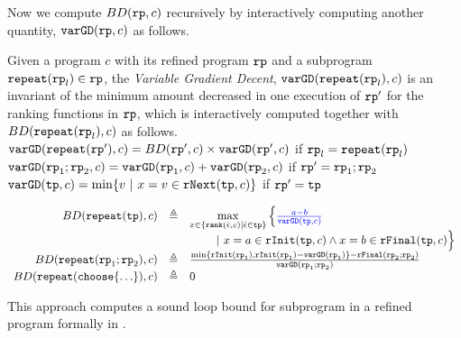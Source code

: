 Now we compute $BD(\mathtt{rp}, c)$ recursively by interactively computing another quantity, $\mathtt{varGD}(\mathtt{rp}, c)$ as follows.
\begin{defn}
\label{def:loopbound}
Given a program $c$ with its refined program $\mathtt{rp}$ and a subprogram $\mathtt{repeat}(\mathtt{rp}_l) \in \mathtt{rp}$,
the \emph{Variable Gradient Decent}, 
 $\mathtt{varGD}(\mathtt{repeat}(\mathtt{rp}_l), c)$ is an invariant of the minimum amount decreased in one execution of $\mathtt{rp}'$ for the ranking functions in $\mathtt{rp}$, which is interactively computed together with $BD(\mathtt{repeat}(\mathtt{rp}_l), c)$ as follows.
 \\
 {$\mathtt{varGD}(\mathtt{repeat}(\mathtt{rp}'), c) =  BD(\mathtt{rp}', c)  \times
{\ensuremath{\mathtt{varGD}}(\ensuremath{\mathtt{rp}}', c)}$} if $\mathtt{rp}_l = \mathtt{repeat}(\mathtt{rp}_l)$
 \\
 $\mathtt{varGD}(\mathtt{rp}_1;\mathtt{rp}_2, c) =  \mathtt{varGD}(\mathtt{rp}_1, c) + \mathtt{varGD}(\mathtt{rp}_2, c)$ if $\mathtt{rp}' = \mathtt{rp}_1;\mathtt{rp}_2$
 \\
 $\varGD(\tpath, c) =  \min\left\{v  ~|~ x = v \in \rfnext(\tpath, c) \right\}  $  if $\mathtt{rp}' = \mathtt{tp}$

{\small
\[
  \begin{array}{rcl}
    BD(\rprepeat(\tpath), c) & \triangleq &  \max\limits_{x \in \left\{ \locbound(\absevent, c) | \absevent \in \tpath \right\}}
    \Big\{ \highlight{\frac{a - b}{\varGD(\tpath, c)}} 
    \\ & & \qquad 
    ~\vert~
    x = a \in \rfinit(\tpath, c)
    \land x = b \in \rffinal(\tpath, c)
    \Big\} 
    \\
    BD(\rprepeat(\rprog_1;\rprog_2), c) & \triangleq & 
    \frac{\min\{ \rfinit(\rprog_1), \rfinit(\rprog_1) - \varGD(\rprog_1) \} - \rffinal(\rprog_2;\rprog_2)}{ 
    \varGD(\rprog_1;\rprog_2)} 
    \\
    BD(\rprepeat(\rpchoose{\ldots }), c) & \triangleq  & 0 
  \end{array}
\]
}
\end{defn}
This approach computes a sound loop bound for subprogram in a refined program formally in .
